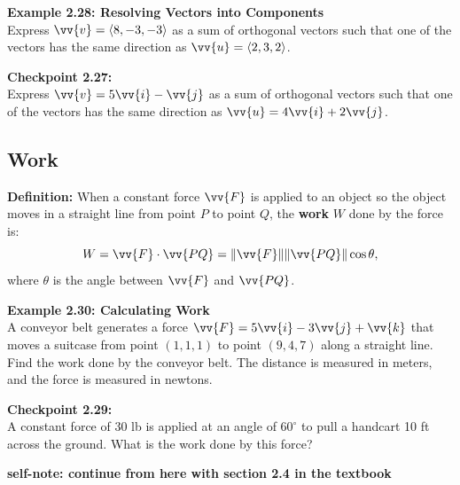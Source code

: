 \documentclass{article}
\begin{document}
\begin{examplebox}
    \textbf{Example 2.28: Resolving Vectors into Components} \\
    Express \(\vv{v} = \langle 8, -3, -3 \rangle\) as a sum of orthogonal vectors such that one of the vectors has the same direction as \(\vv{u} = \langle 2, 3, 2 \rangle\).
\end{examplebox}

\begin{exercisebox}
    \textbf{Checkpoint 2.27:} \\
    Express \(\vv{v} = 5\vv{i} - \vv{j}\) as a sum of orthogonal vectors such that one of the vectors has the same direction as \(\vv{u} = 4\vv{i} + 2\vv{j}\).
\end{exercisebox}

\subsection*{Work}

\begin{definitionbox}
    \textbf{Definition:} When a constant force \(\vv{F}\) is applied to an object so the object moves in a straight line from point \(P\) to point \(Q\), the \textbf{work} \(W\) done by the force is:
    \[
    W = \vv{F} \cdot \vv{PQ} = \|\vv{F}\| \|\vv{PQ}\| \cos \theta,
    \]
    where \(\theta\) is the angle between \(\vv{F}\) and \(\vv{PQ}\).
\end{definitionbox}

\begin{examplebox}
    \textbf{Example 2.30: Calculating Work} \\
    A conveyor belt generates a force \(\vv{F} = 5\vv{i} - 3\vv{j} + \vv{k}\) that moves a suitcase from point \((1, 1, 1)\) to point \((9, 4, 7)\) along a straight line. Find the work done by the conveyor belt. The distance is measured in meters, and the force is measured in newtons.
\end{examplebox}

\begin{exercisebox}
    \textbf{Checkpoint 2.29:} \\
    A constant force of 30 lb is applied at an angle of \(60^\circ\) to pull a handcart 10 ft across the ground. What is the work done by this force?
\end{exercisebox}

\textbf{self-note: continue from here with section 2.4 in the textbook}
\end{document}
